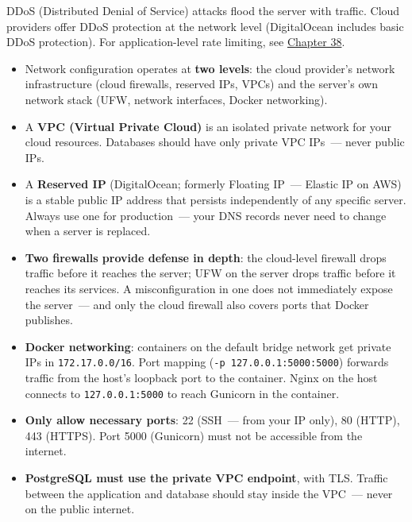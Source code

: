 DDoS (Distributed Denial of Service) attacks flood the server with traffic. Cloud providers offer DDoS protection at the network level (DigitalOcean includes basic DDoS protection). For application-level rate limiting, see \hyperref[ch:38-security]{Chapter 38}.

\label{22-network-configuration:key-takeaways}
\begin{takeaways}

\begin{itemize}
\tightlist
\item
  Network configuration operates at \textbf{two levels}: the cloud provider's network infrastructure (cloud firewalls, reserved IPs, VPCs) and the server's own network stack (UFW, network interfaces, Docker networking).
\item
  A \textbf{VPC (Virtual Private Cloud)} is an isolated private network for your cloud resources. Databases should have only private VPC IPs~--- never public IPs.
\item
  A \textbf{Reserved IP} (DigitalOcean; formerly Floating IP~--- Elastic IP on AWS) is a stable public IP address that persists independently of any specific server. Always use one for production~--- your DNS records never need to change when a server is replaced.
\item
  \textbf{Two firewalls provide defense in depth}: the cloud-level firewall drops traffic before it reaches the server; UFW on the server drops traffic before it reaches its services. A misconfiguration in one does not immediately expose the server~--- and only the cloud firewall also covers ports that Docker publishes.
\item
  \textbf{Docker networking}: containers on the default bridge network get private IPs in \texttt{172.17.0.0/16}. Port mapping (\texttt{-p\ 127.0.0.1:5000:5000}) forwards traffic from the host's loopback port to the container. Nginx on the host connects to \texttt{127.0.0.1:5000} to reach Gunicorn in the container.
\item
  \textbf{Only allow necessary ports}: 22 (SSH~--- from your IP only), 80 (HTTP), 443 (HTTPS). Port 5000 (Gunicorn) must not be accessible from the internet.
\item
  \textbf{PostgreSQL must use the private VPC endpoint}, with TLS. Traffic between the application and database should stay inside the VPC~--- never on the public internet.
\end{itemize}

\end{takeaways}

